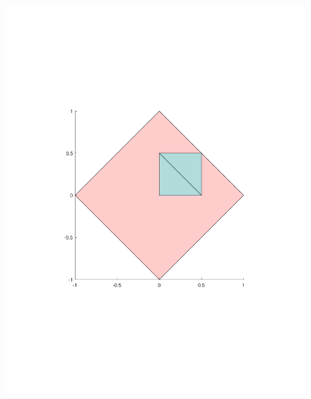 \documentclass[9pt]{beamer}
\begin{document}
\begin{frame}
\begin{columns}[T, onlytextwidth]
		\begin{column}{0.5\textwidth} %
			\begin{figure}
				\centering
				\includegraphics[width=\linewidth]{part2.pdf}
			\end{figure}
		\end{column}
	\end{columns}
	\vspace{-3cm}
	\begin{columns}[T, onlytextwidth] %
		\begin{column}{0.5\textwidth} %
			\begin{figure}
				\centering

\end{figure}
\end{column}
\end{columns}
\end{frame}
\end{document}

